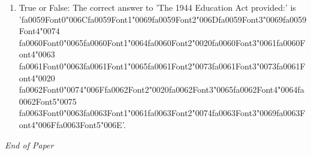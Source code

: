 \documentclass[12pt]{article}
\begin{document}
\begin{enumerate}[label=\arabic*.]
\item True or False: The correct answer to 'The 1944 Education Act provided:' is '{\csname fa0059Font0\endcsname\char"006C}{\csname fa0059Font1\endcsname\char"0069}{\csname fa0059Font2\endcsname\char"006D}{\csname fa0059Font3\endcsname\char"0069}{\csname fa0059Font4\endcsname\char"0074} {\csname fa0060Font0\endcsname\char"0065}{\csname fa0060Font1\endcsname\char"0064}{\csname fa0060Font2\endcsname\char"0020}{\csname fa0060Font3\endcsname\char"0061}{\csname fa0060Font4\endcsname\char"0063} {\csname fa0061Font0\endcsname\char"0063}{\csname fa0061Font1\endcsname\char"0065}{\csname fa0061Font2\endcsname\char"0073}{\csname fa0061Font3\endcsname\char"0073}{\csname fa0061Font4\endcsname\char"0020} {\csname fa0062Font0\endcsname\char"0074}{\char"006F}{\csname fa0062Font2\endcsname\char"0020}{\csname fa0062Font3\endcsname\char"0065}{\csname fa0062Font4\endcsname\char"0064}{\csname fa0062Font5\endcsname\char"0075} {\csname fa0063Font0\endcsname\char"0063}{\csname fa0063Font1\endcsname\char"0061}{\csname fa0063Font2\endcsname\char"0074}{\csname fa0063Font3\endcsname\char"0069}{\csname fa0063Font4\endcsname\char"006F}{\csname fa0063Font5\endcsname\char"006E}'.
\end{enumerate}

\vfill
\noindent\textit{End of Paper}
\end{document}
